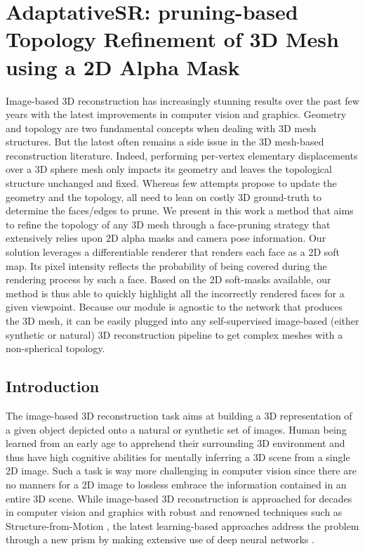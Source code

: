 \chapter{AdaptativeSR: pruning-based Topology Refinement of 3D Mesh using a 2D Alpha Mask
}
\label{chapter:appendix-adaptativeSR}

{}



Image-based 3D reconstruction has increasingly stunning results over the past few years with the latest improvements in computer vision and graphics. Geometry and topology are two fundamental concepts when dealing with 3D mesh structures. But the latest often remains a side issue in the 3D mesh-based reconstruction literature. Indeed, performing per-vertex elementary displacements over a 3D sphere mesh only impacts its geometry and leaves the topological structure unchanged and fixed. Whereas few attempts propose to update the geometry and the topology, all need to lean on costly 3D ground-truth to determine the faces/edges to prune. We present in this work a method that aims to refine the topology of any 3D mesh through a face-pruning strategy that extensively relies upon 2D alpha masks and camera pose information. Our solution leverages a differentiable renderer that renders each face as a 2D soft map. Its pixel intensity reflects the probability of being covered during the rendering process by such a face. Based on the 2D soft-masks available, our method is thus able to quickly highlight all the incorrectly rendered faces for a given viewpoint. Because our module is agnostic to the network that produces the 3D mesh, it can be easily plugged into any self-supervised image-based (either synthetic or natural) 3D reconstruction pipeline to get complex meshes with a non-spherical topology.

\section{Introduction}
\label{appendix:adaptativesr-intro}

The image-based 3D reconstruction task aims at building a 3D representation of a given object depicted onto a natural or synthetic set of images. Human being learned from an early age to apprehend their surrounding 3D environment and thus have high cognitive abilities for mentally inferring a 3D scene from a single 2D image. Such a task is way more challenging in computer vision since there are no manners for a 2D image to lossless embrace the information contained in an entire 3D scene. While image-based 3D reconstruction is approached for decades in computer vision and graphics with robust and renowned techniques such as Structure-from-Motion \citep{longuet1981computer}, the latest learning-based approaches address the problem through a new prism by making extensive use of deep neural networks
\citep{kanazawa2018learning,deng2019accurate,saito2020pifuhd}.

